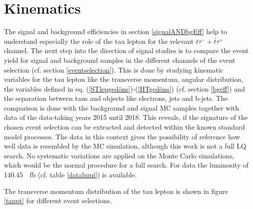 \section{Kinematics}\label{Kinematics}
The signal and background efficiencies in section \ref{signalANDbgEff} help to understand especially the role of the tau lepton for the relevant $t\tau^{-}+\bar{t}\tau^{+}$ channel. The next step into the direction of signal studies is to compare the event yield for signal and background samples in the different channels of the event selection (cf. section \ref{eventselection}). This is done by studying kinematic variables for the tau lepton like the transverse momentum, angular distribution, the variables defined in eq. (\ref{STlepgedöns})-(\ref{HTgedöns}) (cf. section \ref{bgeff}) and the separation between taus and objects like electrons, jets and b-jets. The comparison is done with the background and signal MC samples together with data of the data-taking years 2015 until 2018. This reveals, if the signature of the chosen event selection can be extracted and detected within the known standard model processes. The data in this context gives the possibility of reference how well data is resembled by the MC simulation, although this work is not a full LQ search. No systematic variations are applied on the Monte Carlo simulations, which would be the normal procedure for a full search. For data the luminosity of \SI{140.45}{\per\femto\barn} (cf. table \ref{datalumi}) is available.\par
The transverse momentum distribution of the tau lepton is shown in figure \ref{taupt} for different event selections.
%

